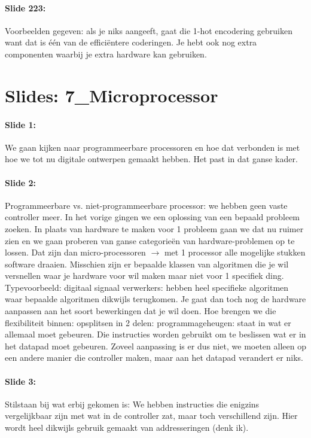 \documentclass[10pt,a4paper]{book}
\begin{document}
\paragraph{Slide 223:} Voorbeelden gegeven: als je niks aangeeft, gaat die 1-hot encodering gebruiken want dat is \'e\'en van de effici\"entere coderingen. Je hebt ook nog extra componenten waarbij je extra hardware kan gebruiken. 

\section{Slides: 7\_Microprocessor} 

\paragraph{Slide 1:} We gaan kijken naar programmeerbare processoren en hoe dat verbonden is met hoe we tot nu digitale ontwerpen gemaakt hebben. Het past in dat ganse kader.

\paragraph{Slide 2:} Programmeerbare vs. niet-programmeerbare processor: we hebben geen vaste controller meer. In het vorige gingen we een oplossing van een bepaald probleem zoeken. In plaats van hardware te maken voor 1 probleem gaan we dat nu ruimer zien en we gaan proberen van ganse categorie\"en van hardware-problemen op te lossen. Dat zijn dan micro-processoren $\rightarrow$ met 1 processor alle mogelijke stukken software draaien. Misschien zijn er bepaalde klassen van algoritmen die je wil versnellen waar je hardware voor wil maken maar niet voor 1 specifiek ding. Typevoorbeeld: digitaal signaal verwerkers: hebben heel specifieke algoritmen waar bepaalde algoritmen dikwijls terugkomen. Je gaat dan toch nog de hardware aanpassen aan het soort bewerkingen dat je wil doen. Hoe brengen we die flexibiliteit binnen: opsplitsen in 2 delen: programmageheugen: staat in wat er allemaal moet gebeuren. Die instructies worden gebruikt om te beslissen wat er in het datapad moet gebeuren. Zoveel aanpassing is er dus niet, we moeten alleen op een andere manier die controller maken, maar aan het datapad verandert er niks.

\paragraph{Slide 3:} Stilstaan bij wat erbij gekomen is: We hebben instructies die enigzins vergelijkbaar zijn met wat in de controller zat, maar toch verschillend zijn. Hier wordt heel dikwijls gebruik gemaakt van addresseringen (denk ik).
\end{document}
